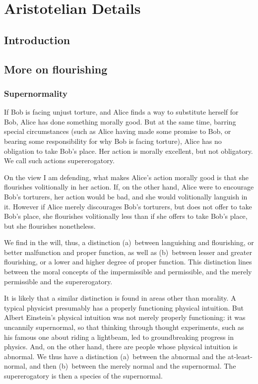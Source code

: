 \def\mychapter{XII}

\chapter{Aristotelian Details}\label{ch:details}
\section{Introduction}
\section{More on flourishing}
\subsection{Supernormality}
If Bob is facing unjust torture, and Alice finds a way to substitute herself for Bob, 
Alice has done something morally good. But at the same time, barring special circumstances
(such as Alice having made some promise to Bob, or bearing some responsibility for why
Bob is facing torture), Alice has no obligation to take Bob's place. Her action is morally
excellent, but not obligatory. We call such actions supererogatory.

On the view I am defending, what makes Alice's action morally good is that she 
flourishes volitionally in her action. If, on the other hand, Alice were to encourage Bob's 
torturers, her action would be bad, and she would volitionally languish in it. However if Alice
merely discourages Bob's torturers, but does not offer to take Bob's place, she flourishes
volitionally less than if she offers to take Bob's place, but she flourishes nonetheless.

We find in the will, thus, a distinction (a)~between languishing and flourishing, or 
better malfunction and proper function, as well as (b)~between lesser and greater flourishing,
or a lower and higher degree of proper function. This distinction lines between the moral concepts of
the impermissible and permissible, and the merely permissible and the supererogatory. 

It is likely that a similar distinction is found in areas other than morality. A typical
physicist presumably has a properly functioning physical intuition. But Albert Einstein's physical 
intuition was not merely properly functioning: it was uncannily supernormal, so that thinking through
thought experiments, such as his famous one about riding a lightbeam, led to groundbreaking
progress in physics. And, on the other hand, there are people whose physical intuition is
abnormal. We thus have a distinction (a)~between the abnormal and the at-least-normal, and then
(b)~between the merely normal and the supernormal. The supererogatory is then a species of the
supernormal.

